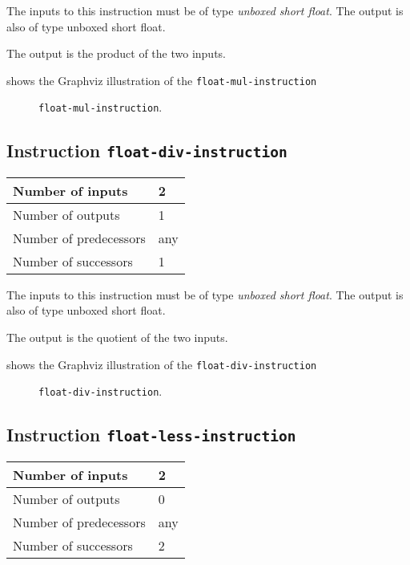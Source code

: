 The inputs to this instruction must be of type \emph{unboxed short
  float}. The output is also of type unboxed short float.

The output is the product of the two inputs.

 shows the Graphviz illustration of the
\texttt{float-mul-instruction}

\begin{figure}
\begin{center}
\end{center}
\caption{\label{fig-float-mul-instruction}
\texttt{float-mul-instruction}.}
\end{figure}

\subsection{Instruction \texttt{float-div-instruction}}
\label{mir-instruction-float-div}

\begin{tabular}{|l|l|}
\hline
Number of inputs & 2\\
\hline
Number of outputs & 1\\
\hline
Number of predecessors & any\\
\hline
Number of successors & 1\\
\hline
\end{tabular}

The inputs to this instruction must be of type \emph{unboxed short
  float}. The output is also of type unboxed short float.

The output is the quotient of the two inputs.

 shows the Graphviz illustration of the
\texttt{float-div-instruction}

\begin{figure}
\begin{center}
\end{center}
\caption{\label{fig-float-div-instruction}
\texttt{float-div-instruction}.}
\end{figure}

\subsection{Instruction \texttt{float-less-instruction}}
\label{mir-instruction-float-less}

\begin{tabular}{|l|l|}
\hline
Number of inputs & 2\\
\hline
Number of outputs & 0\\
\hline
Number of predecessors & any\\
\hline
Number of successors & 2\\
\hline
\end{tabular}

